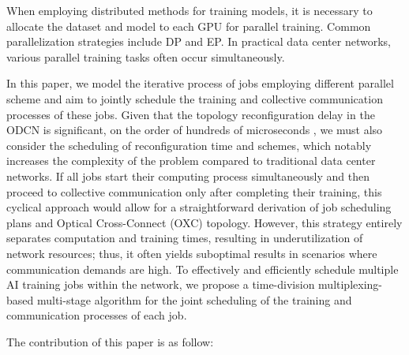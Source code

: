 \documentclass[conference]{IEEEtran}
\begin{document}

When employing distributed methods for training models, it is necessary to allocate the dataset and model to each GPU for parallel training. Common parallelization strategies include DP and EP. In practical data center networks, various parallel training tasks often occur simultaneously.


In this paper, we model the iterative process of jobs employing different parallel scheme and aim to jointly schedule the training and collective communication processes of these jobs. Given that the topology reconfiguration delay in the ODCN is significant, on the order of hundreds of microseconds \cite{Zerwas2021}, we must also consider the scheduling of reconfiguration time and schemes, which notably increases the complexity of the problem compared to traditional data center networks. If all jobs start their computing process simultaneously and then proceed to collective communication only after completing their training, this cyclical approach would allow for a straightforward derivation of job scheduling plans and Optical Cross-Connect (OXC) topology. However, this strategy entirely separates computation and training times, resulting in underutilization of network resources; thus, it often yields suboptimal results in scenarios where communication demands are high. To effectively and efficiently schedule multiple AI training jobs within the network, we propose a time-division multiplexing-based multi-stage algorithm for the joint scheduling of the training and communication processes of each job.

The contribution of this paper is as follow:
\end{document}
